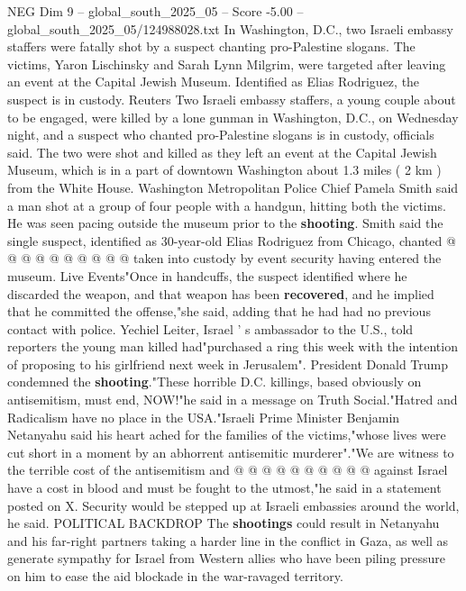 \begin{textsample}{NEG Dim 9 – global\_south\_2025\_05 – Score -5.00 – global\_south\_2025\_05/124988028.txt}  \label{ex:f9_neg_223}
In Washington, D.C., two Israeli embassy staffers were fatally shot by a suspect chanting pro-Palestine slogans.
The victims, Yaron Lischinsky and Sarah Lynn Milgrim, were targeted after leaving an event at the Capital Jewish Museum.
Identified as Elias Rodriguez, the suspect is in custody.
Reuters Two Israeli embassy staffers, a young couple about to be engaged, were killed by a lone gunman in Washington, D.C., on Wednesday night, and a suspect who chanted pro-Palestine slogans is in custody, officials said.
The two were shot and killed as they left an event at the Capital Jewish Museum, which is in a part of downtown Washington about 1.3 miles ( 2 km ) from the White House.
Washington Metropolitan Police Chief Pamela Smith said a man shot at a group of four people with a handgun, hitting both the victims.
He was seen pacing outside the museum prior to the \textbf{shooting}.
Smith said the single suspect, identified as 30-year-old Elias Rodriguez from Chicago, chanted @ @ @ @ @ @ @ @ @ @ taken into custody by event security having entered the museum.
Live Events"Once in handcuffs, the suspect identified where he discarded the weapon, and that weapon has been \textbf{recovered}, and he implied that he committed the offense,"she said, adding that he had had no previous contact with police.
Yechiel Leiter, Israel ' s ambassador to the U.S., told reporters the young man killed had"purchased a ring this week with the intention of proposing to his girlfriend next week in Jerusalem".
President Donald Trump condemned the \textbf{shooting}."These horrible D.C. killings, based obviously on antisemitism, must end, NOW!"he said in a message on Truth Social."Hatred and Radicalism have no place in the USA."Israeli Prime Minister Benjamin Netanyahu said his heart ached for the families of the victims,"whose lives were cut short in a moment by an abhorrent antisemitic murderer"."We are witness to the terrible cost of the antisemitism and @ @ @ @ @ @ @ @ @ @ against Israel have a cost in blood and must be fought to the utmost,"he said in a statement posted on X.
Security would be stepped up at Israeli embassies around the world, he said.
POLITICAL BACKDROP The \textbf{shootings} could result in Netanyahu and his far-right partners taking a harder line in the conflict in Gaza, as well as generate sympathy for Israel from Western allies who have been piling pressure on him to ease the aid blockade in the war-ravaged territory.

\end{textsample}
